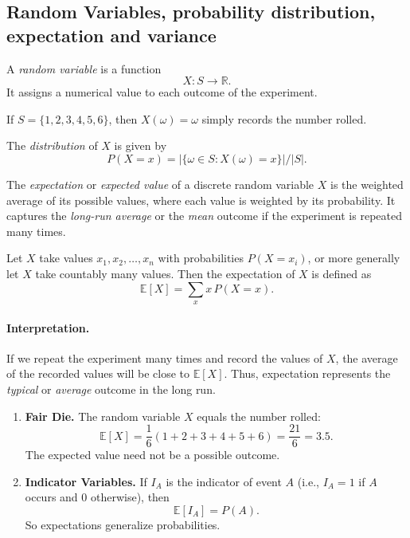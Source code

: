 \subsection{Random Variables, probability distribution, expectation and variance}

A \emph{random variable} is a function
\[
X : S \longrightarrow \mathbb{R}.
\]
It assigns a numerical value to each outcome of the experiment.

\begin{example}
If $S=\{1,2,3,4,5,6\}$, then $X(\omega)=\omega$ simply records the number rolled.
\end{example}

The \emph{distribution} of $X$ is given by
\[
P(X=x)=|\{\omega\in S : X(\omega)=x\}|/|S|.
\]


The \emph{expectation} or \emph{expected value} of a discrete random variable
$X$ is the weighted average of its possible values, where each value is
weighted by its probability. It captures the \emph{long-run average} or the \emph{mean} outcome
if the experiment is repeated many times.

Let $X$ take values $x_1, x_2, \dots, x_n$ with probabilities
$P(X=x_i)$, or more generally let $X$ take countably many values.
Then the expectation of $X$ is defined as
\[
\mathbb{E}[X] = \sum_{x} x \, P(X=x).
\]

\paragraph{Interpretation.}
If we repeat the experiment many times and record the values of $X$, the
average of the recorded values will be close to $\mathbb{E}[X]$.
Thus, expectation represents the \emph{typical} or \emph{average}
outcome in the long run.

\begin{example}
\begin{enumerate}
  \item \textbf{Fair Die.}  
  The random variable $X$ equals the number rolled:
  \[
  \mathbb{E}[X]
  = \frac{1}{6}(1+2+3+4+5+6)
  = \frac{21}{6}
  = 3.5.
  \]
  The expected value need not be a possible outcome.

  \item \textbf{Indicator Variables.}  
  If $I_A$ is the indicator of event $A$ (i.e., $I_A=1$ if $A$ occurs and
  $0$ otherwise), then
  \[
  \mathbb{E}[I_A] = P(A).
  \]
  So expectations generalize probabilities.
\end{enumerate}
\end{example}


